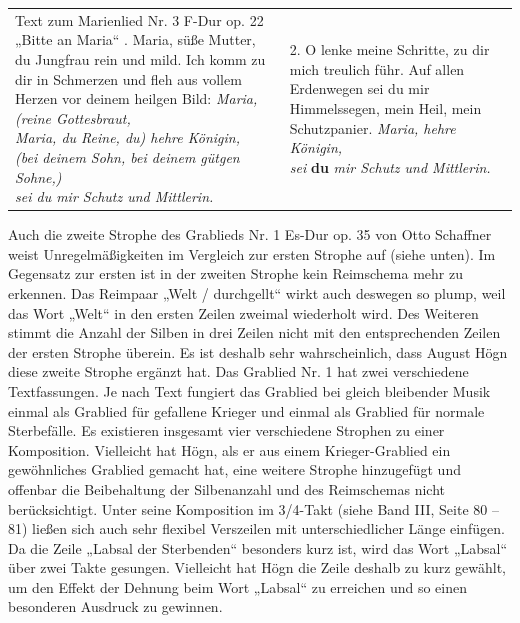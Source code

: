 \begin{flushleft}
\tablefirsthead{}
\tablehead{}
\tabletail{}
\tablelasttail{}
\begin{supertabular}{m{7.9230003cm}m{7.9230003cm}}
Text zum Marienlied Nr. 3 F-Dur op. 22 „Bitte an Maria“\newline
{}. Maria, süße Mutter, \newline
du Jungfrau rein und mild.\newline
Ich komm zu dir in Schmerzen \newline
und fleh aus vollem Herzen\newline
vor deinem heilgen Bild:\newline
\textit{Maria, (reine Gottesbraut, \newline
Maria, du Reine, du) hehre Königin,\newline
(bei deinem Sohn, bei deinem gütgen Sohne,) \newline
sei du mir Schutz und Mittlerin.} &
2. O lenke meine Schritte, \newline
zu dir mich treulich führ.\newline
Auf allen Erdenwegen\newline
sei du mir Himmelssegen, \newline
mein Heil, mein Schutzpanier. \newline
\textit{Maria, hehre Königin,\newline
sei  }\textbf{du}\textit{ mir Schutz und Mittlerin.}\\
\end{supertabular}
\end{flushleft}
Auch die zweite Strophe des Grablieds Nr. 1 Es-Dur op. 35 von Otto
Schaffner weist Unregelmäßigkeiten im Vergleich zur ersten Strophe auf
(siehe unten). Im Gegensatz zur ersten ist in der zweiten Strophe kein
Reimschema mehr zu erkennen. Das Reimpaar „Welt / durchgellt“ wirkt
auch deswegen so plump, weil das Wort „Welt“ in den ersten Zeilen
zweimal wiederholt wird. Des Weiteren stimmt die Anzahl der Silben in
drei Zeilen nicht mit den entsprechenden Zeilen der ersten Strophe
überein. Es ist deshalb sehr wahrscheinlich, dass August Högn diese
zweite Strophe ergänzt hat. Das Grablied Nr. 1 hat zwei verschiedene
Textfassungen. Je nach Text fungiert das Grablied bei gleich bleibender
Musik einmal als Grablied für gefallene Krieger und einmal als Grablied
für normale Sterbefälle. Es existieren insgesamt vier verschiedene
Strophen zu einer Komposition. Vielleicht hat Högn, als er aus einem
Krieger-Grablied ein gewöhnliches Grablied gemacht hat, eine weitere
Strophe hinzugefügt und offenbar die Beibehaltung der Silbenanzahl und
des Reimschemas nicht berücksichtigt. Unter seine Komposition im
3/4-Takt (siehe Band III, Seite 80 – 81) ließen sich auch sehr flexibel
Verszeilen mit unterschiedlicher Länge einfügen. Da die Zeile „Labsal
der Sterbenden“ besonders kurz ist, wird das Wort „Labsal“ über zwei
Takte gesungen. Vielleicht hat Högn die Zeile deshalb zu kurz gewählt,
um den Effekt der Dehnung beim Wort „Labsal“ zu erreichen und so einen
besonderen Ausdruck zu gewinnen.

